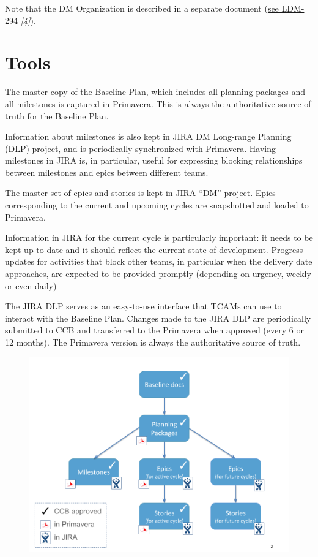 \documentclass[DM,toc,obsolete]{lsstdoc}
\newcommand{\sphinxcrossref}[1]{\emph{#1}}
\begin{document}
Note that the DM Organization is described in a separate document (\href{https://ls.st/LDM-294}{see LDM-294} \label{\detokenize{index:id10}}{\hyperref[\detokenize{index:ldm-294}]{\sphinxcrossref{{[}4{]}}}}).


\section{Tools}
\label{\detokenize{index:tools}}
The master copy of the Baseline Plan, which includes all planning packages and all milestones is captured
in Primavera. This is always the authoritative source of truth for the Baseline Plan.

Information about milestones is also kept in JIRA DM Long-range Planning (DLP) project, and is periodically
synchronized with Primavera. Having milestones in JIRA is, in particular, useful for expressing blocking
relationships between milestones and epics between different teams.

The master set of epics and stories is kept in JIRA ``DM'' project. Epics corresponding to the current
and upcoming cycles are snapshotted and loaded to Primavera.

Information in JIRA for the current cycle is particularly important: it needs to be
kept up-to-date and it should reflect the current state of development. Progress
updates for activities that block other teams, in particular when the delivery date
approaches, are expected to be provided promptly (depending on urgency, weekly or even daily)

The JIRA DLP serves as an easy-to-use interface that TCAMs can use to interact with
the Baseline Plan. Changes made to the JIRA DLP are periodically submitted to CCB
and transferred to the Primavera when approved (every 6 or 12 months). The Primavera
version is always the authoritative source of truth.

\begin{figure}
\includegraphics[width=\textwidth]{baselinePlanDiagram.png}
\end{figure}
\end{document}
